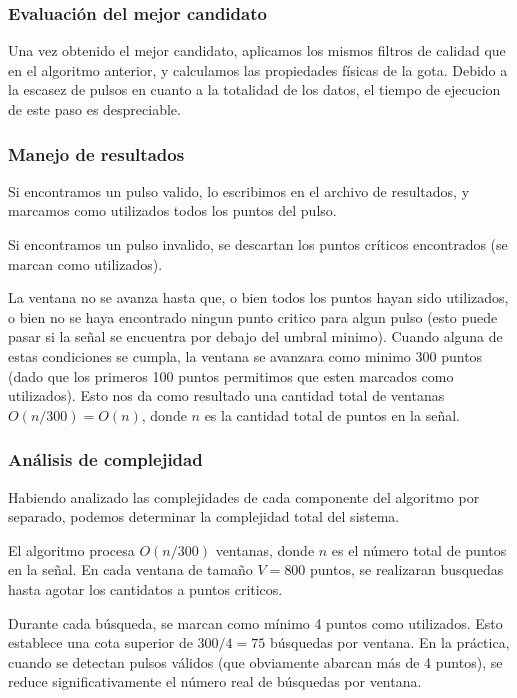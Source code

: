 \documentclass[12pt,a4paper]{article}
\begin{document}
\subsubsection{Evaluación del mejor candidato}

Una vez obtenido el mejor candidato, aplicamos los mismos filtros de calidad que en el algoritmo anterior, y calculamos las propiedades físicas de la gota. Debido a la escasez de pulsos en cuanto a la totalidad de los datos, el tiempo de ejecucion de este paso es despreciable.

\subsubsection{Manejo de resultados}

Si encontramos un pulso valido, lo escribimos en el archivo de resultados, y marcamos como utilizados todos los puntos del pulso.

Si encontramos un pulso invalido, se descartan los puntos críticos encontrados (se marcan como utilizados).

La ventana no se avanza hasta que, o bien todos los puntos hayan sido utilizados, o bien no se haya encontrado ningun punto critico para algun pulso (esto puede pasar si la señal se encuentra por debajo del umbral minimo). Cuando alguna de estas condiciones se cumpla, la ventana se avanzara como minimo 300 puntos (dado que los primeros 100 puntos permitimos que esten marcados como utilizados). Esto nos da como resultado una cantidad total de ventanas $O(n / 300) = O(n)$, donde $n$ es la cantidad total de puntos en la señal.

\subsubsection{Análisis de complejidad}

Habiendo analizado las complejidades de cada componente del algoritmo por separado, podemos determinar la complejidad total del sistema.

El algoritmo procesa $O(n/300)$ ventanas, donde $n$ es el número total de puntos en la señal. En cada ventana de tamaño $V = 800$ puntos, se realizaran busquedas hasta agotar los cantidatos a puntos criticos.

Durante cada búsqueda, se marcan como mínimo 4 puntos como utilizados. Esto establece una cota superior de $300/4 = 75$ búsquedas por ventana. En la práctica, cuando se detectan pulsos válidos (que obviamente abarcan más de 4 puntos), se reduce significativamente el número real de búsquedas por ventana.
\end{document}
